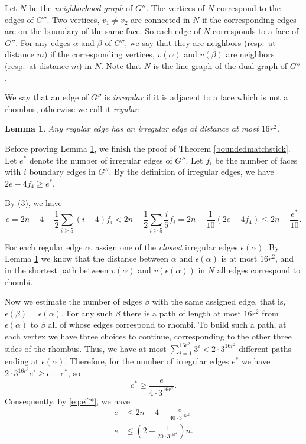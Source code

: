 \documentclass[12pt]{article}
\theoremstyle{plain}
\newtheorem{lemma}[theorem]{Lemma}
\theoremstyle{definition}
\theoremstyle{remark}
\begin{document}
\smallskip

Let $N$ be the \emph{neighborhood graph} of $G''$. The vertices of $N$ 
correspond to the edges of $G''$. 
Two vertices, $v_1\neq v_2$ are connected in $N$ if the corresponding edges are on the boundary of 
the same face. So each edge of $N$ corresponds to a face of $G''$.
For any edges $\alpha$ and $\beta$ of $G''$, we say that they are neighbors (resp.\ at distance $m$) if the corresponding
vertices, $v(\alpha)$ and $v(\beta)$ are neighbors (resp.\ at distance $m$) in $N$. Note that $N$ is the line graph of the dual graph of $G''$.

We say that an edge of $G''$ is \emph{irregular} if it is adjacent to a face which is not a rhombus, otherwise we call it \emph{regular}. 

\begin{lemma}\label{monopath}
Any regular edge has an irregular edge at distance at most $16r^2$.
\end{lemma} 

\smallskip


Before proving Lemma \ref{monopath}, we finish the proof of Theorem \ref{boundedmatchstick}. 
Let $e^*$ denote the number of irregular edges of $G''$. 
Let $f_i$ be the number of faces with $i$ boundary edges in $G''$.
By the definition of irregular edges, we have $2e-4f_4 \geq e^*$.

\smallskip
By (3), we have 
\begin{equation}\label{eq:e^*}
e=2n-4-\frac{1}{2}\sum\limits_{i\geq 5}(i-4)f_i
< 2n-\frac{1}{2}\sum\limits_{i\geq 5}\frac{i}{5}f_i
= 2n- \frac{1}{10} (2e-4f_4)
\le 2n-\frac{e^*}{10}.
\end{equation}



For each regular edge $\alpha$, assign one of the \emph{closest} irregular edges
$\epsilon(\alpha)$.
By Lemma \ref{monopath} 
we know that the distance between 
$\alpha$ and $\epsilon(\alpha)$ is at most $16r^2$, and in the shortest path 
between $v(\alpha)$ and $v(\epsilon(\alpha))$ in $N$  
all edges correspond to rhombi. 
\smallskip

Now we estimate the number of edges $\beta$ with the same assigned edge, that is, 
$\epsilon(\beta)=\epsilon(\alpha)$. 
For any such $\beta$ there is a path of length at most $16r^2$ from $\epsilon(\alpha)$ to $\beta$ 
all of whose edges correspond to rhombi. To build such a path, at each vertex we have three choices
to continue, corresponding to the other three sides of the rhombus. 
Thus, we have at most $\sum_{i=1}^{16r^2}3^i<2\cdot 3^{16r^2}$ different paths ending at $\epsilon(\alpha)$. Therefore, for the number of irregular edges $e^*$ we have
$2\cdot 3^{16r^2}e'\ge e-e^*$, so \[e^*\ge \frac{e}{4\cdot 3^{16r^2}}.\]
Consequently, by \eqref{eq:e^*}, we have
\begin{align*}
    e &\le 2n-4-\frac{e}{40\cdot 3^{16r^2}}\\
    e &\le \left(2-\frac{1}{20\cdot 3^{16r^2}} \right)n.
\end{align*}
\end{document}
